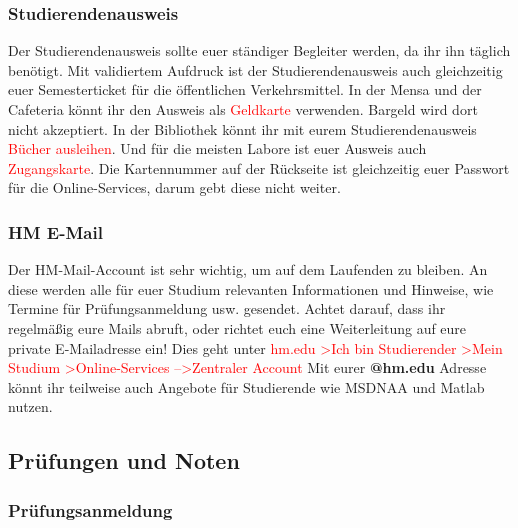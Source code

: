 \subsubsection{Studierendenausweis}

Der Studierendenausweis sollte euer ständiger Begleiter werden, da ihr ihn täglich benötigt. Mit validiertem Aufdruck ist der Studierendenausweis auch gleichzeitig euer Semesterticket für die öffentlichen Verkehrsmittel. In der Mensa und der Cafeteria könnt ihr den Ausweis als \textcolor{red}{Geldkarte} verwenden. Bargeld wird dort nicht akzeptiert. In der Bibliothek könnt ihr mit eurem Studierendenausweis \textcolor{red}{Bücher ausleihen}. Und für die meisten Labore ist euer Ausweis auch \textcolor{red}{Zugangskarte}. Die Kartennummer auf der Rückseite ist gleichzeitig euer Passwort für die Online-Services, darum gebt diese nicht weiter.

\subsubsection{HM E-Mail}

Der HM-Mail-Account ist sehr wichtig, um auf dem Laufenden zu bleiben. An diese werden alle für euer Studium relevanten Informationen und Hinweise, wie Termine für Prüfungsanmeldung usw. gesendet. Achtet darauf, dass ihr regelmäßig eure Mails abruft, oder richtet euch eine Weiterleitung auf eure private E-Mailadresse ein!\doublebreak
Dies geht unter \textcolor{red}{hm.edu \textgreater Ich bin Studierender \textgreater Mein Studium \textgreater Online-Services --\textgreater Zentraler Account}\doublebreak
Mit eurer \textbf{@hm.edu} Adresse könnt ihr teilweise auch Angebote für Studierende wie MSDNAA und Matlab nutzen.

\subsection{Prüfungen und Noten}
\subsubsection{Prüfungsanmeldung}

